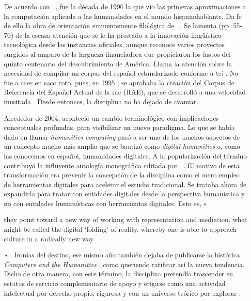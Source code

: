 De acuerdo con \citeauthor{rio2015}~\parencite*[3]{rio2015}, fue la década de 1990 la que vio las primeras aproximaciones a la computación aplicada a las humanidades en el mundo hispanohablante. Da fe de ello la obra de orientación eminentemente filológica de \citeauthor{marcos1994}~\parencite*{marcos1994}. Se lamenta  (pp. 55-70) de la escasa atención que se le ha prestado a la innovación lingüístico-tecnológica desde las instancias oficiales, aunque reconoce varios proyectos surgidos al amparo de la largueza financiadora que propiciaron los fastos del quinto centenario del descubrimiento de América. Llama la atención sobre la necesidad de compilar un corpus del español estandarizado conforme a \ac{tei} \autocite[79-90]{marcos1994}. No fue a caer en saco roto, pues, en 1995 \parencite[197]{rojo2016}, se aprobaba la creación del Corpus de Referencia del Español Actual de la \acl{rae} (RAE), que se desarrolló a una velocidad inusitada \parencites{pino1995}{pino1996}. Desde entonces, la disciplina no ha dejado de avanzar. 

Alrededor de 2004, aconteció un cambio terminológico con implicaciones conceptuales profundas, para visibilizar un nuevo paradigma. Lo que se había dado en llamar \textit{humanities computing} pasó a ser uno de los muchos aspectos de un concepto mucho más amplio que se bautizó como \textit{digital humanities} o, como las conocemos en español, humanidades digitales. A la popularización del término contribuyó la influyente antología monográfica editada por \citeauthor{schreibman2004}~\parencite*{schreibman2004}. El motivo de  esta transformación era prevenir la concepción de la disciplina como el mero empleo de herramientas digitales para acelerar el estudio tradicional. Se trataba ahora de expandirla para tratar con entidades digitales desde la perspectiva humanística y no con entidades humanísticas con herramientas digitales. Esto es, «\begin{english}they point toward a new way of working with representation and mediation, what might be called the digital ‘folding’ of reality, whereby one is able to approach culture in a radically new way\end{english}» \parencite[1]{berry2011}. Ironías del destino, ese mismo año también dejaba de publicarse la histórica \textit{Computers and the Humanities} \parencite[6]{crymble2021}, como queriendo ratificar así la nueva tendencia. Dicho de otra manera, con este término, la disciplina pretendía trascender su estatus de servicio complementario de apoyo y erigirse como una actividad intelectual por derecho propio, rigurosa y con un universo teórico por explorar \parencite[43]{hayles2011}.

